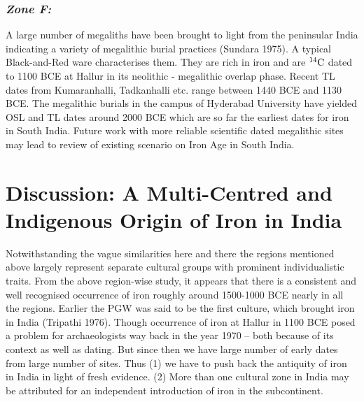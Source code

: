 \subsubsection*{\textit{Zone F:}}

A large number of megaliths have been brought to light from the peninsular India indicating a variety of megalithic burial practices (Sundara 1975). A typical Black-and-Red ware characterises them. They are rich in iron and are $^{14}{\rm C}$ dated to 1100 BCE at Hallur in its neolithic - megalithic overlap phase. Recent TL dates from Kumaranhalli, Tadkanhalli etc. range between 1440 BCE and 1130 BCE. The megalithic burials in the campus of Hyderabad University have yielded OSL and TL dates around 2000 BCE which are so far the earliest dates for iron in South India. Future work with more reliable  scientific  dated megalithic sites may lead to review of existing scenario on Iron Age in South India.

\section*{Discussion: A Multi-Centred and Indigenous Origin of Iron in India}\label{section-5}

Notwithstanding the vague similarities here and there the regions mentioned above largely represent separate cultural groups with prominent individualistic traits. From the above region-wise study, it appears that there is a consistent and well recognised occurrence of iron roughly around 1500-1000 BCE nearly in all the regions. Earlier the PGW was said to be the first culture, which brought iron in India (Tripathi 1976). Though occurrence of iron at Hallur in 1100 BCE posed a problem for archaeologists way back in the year 1970 – both because of its context as well as dating. But since then we have large number of early dates from large number of sites. Thus (1) we have to push back the antiquity of iron in India in light of fresh evidence. (2) More than one cultural zone in India may be attributed for an independent introduction of iron in the subcontinent.

